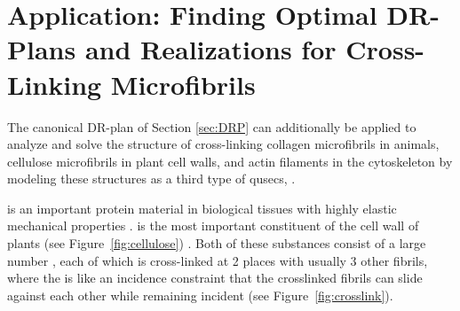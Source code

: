 \section{Application: Finding Optimal DR-Plans and Realizations for Cross-Linking Microfibrils }
\label{sec:pinnedline}

The canonical DR-plan of Section \ref{sec:DRP} can additionally be applied to analyze and solve the structure of cross-linking collagen microfibrils in animals, cellulose microfibrils in plant cell walls, and actin filaments in the cytoskeleton by modeling these structures as a third type of qusecs, .


 is an important protein material in biological tissues with highly elastic mechanical properties \cite{buehler2008nanomechanics}.  is the most important constituent of the cell wall of plants (see Figure~\ref{fig:cellulose}) \cite{fall2013physical,smith1971plant}. Both of these substances consist of a large number ,
each of which is cross-linked at 2 places with usually 3 other fibrils, where the  is like an incidence constraint that the crosslinked fibrils can slide against each other while remaining incident (see Figure~\ref{fig:crosslink}).

%
%
%
%
%
%





